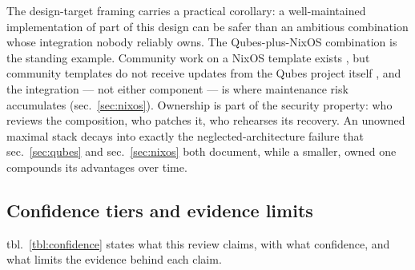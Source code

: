 \documentclass[
  english,
  9pt,
]{extarticle}
\begin{document}
The design-target framing carries a practical corollary: a
well-maintained implementation of part of this design can be safer than
an ambitious combination whose integration nobody reliably owns. The
Qubes-plus-NixOS combination is the standing example. Community work on
a NixOS template exists \citep{qubes_issue_7992}, but community
templates do not receive updates from the Qubes project itself
\citep{qubes_templates}, and the integration --- not either component
--- is where maintenance risk accumulates (sec.~\ref{sec:nixos}).
Ownership is part of the security property: who reviews the composition,
who patches it, who rehearses its recovery. An unowned maximal stack
decays into exactly the neglected-architecture failure that
sec.~\ref{sec:qubes} and sec.~\ref{sec:nixos} both document, while a
smaller, owned one compounds its advantages over time.

\subsection{Confidence tiers and evidence
limits}\label{confidence-tiers-and-evidence-limits}

tbl.~\ref{tbl:confidence} states what this review claims, with what
confidence, and what limits the evidence behind each claim.
\end{document}
